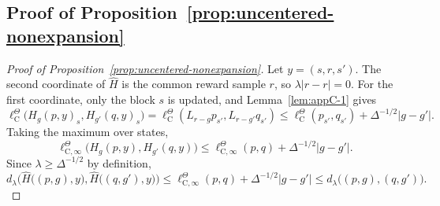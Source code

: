 \documentclass{article}
\begin{document}
\subsection{Proof of Proposition~\ref{prop:uncentered-nonexpansion}}
\begin{proof}[Proof of Proposition~\ref{prop:uncentered-nonexpansion}]
Let $y = (s, r, s')$. The second coordinate of $\widehat H$ is the common reward sample $r$, so $\lambda\lvert r - r \rvert = 0$. For the first coordinate, only the block $s$ is updated, and Lemma~\ref{lem:appC-1} gives
\begin{equation}
\ell^\Theta_\mathrm C\bigl(H_g(p, y)_s, H_{g'}(q, y)_s \bigr) = \ell^\Theta_\mathrm C(L_{r -g}p_{s'}, L_{r-g'}q_{s'}) \le \ell^\Theta_\mathrm C(p_{s'}, q_{s'}) + \Delta^{-1/2}\lvert g -g' \rvert.
\end{equation}
Taking the maximum over states,
\begin{equation}
\ell^\Theta_{\mathrm C, \infty}\bigl(H_g(p, y), H_{g'}(q,y) \bigr) \le \ell^\Theta_{\mathrm C, \infty}(p, q) + \Delta^{-1/2}\lvert g- g'\rvert.
\end{equation}
Since $\lambda \ge \Delta^{-1/2}$ by definition,
\begin{equation}
d_\lambda\bigl(\widehat H\bigl((p, g), y\bigr), \widehat H\bigl((q, g'), y\bigr)\bigr) \le \ell^\Theta_{\mathrm C, \infty}(p, q) + \Delta^{-1/2}\lvert g - g'\rvert \le d_\lambda \bigl((p,g),(q,g') \bigr).
\end{equation}
\end{proof}
\end{document}
